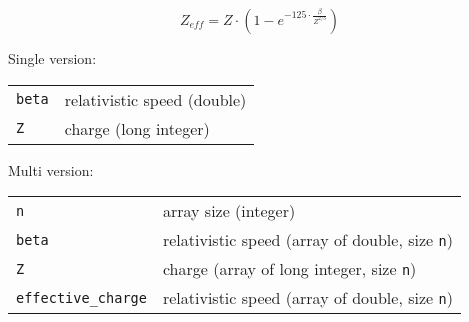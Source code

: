 \begin{equation}
Z_{eff}=Z\cdot(1-e^{-125\cdot\frac{\beta}{Z^{2/3}}})
\end{equation}

Single version:\\

\begin{tabular}{l l}
\texttt{beta} & relativistic speed (double) \\
\texttt{Z} & charge (long integer) \\
\end{tabular}

Multi version:\\

\begin{tabular}{l l}
\texttt{n} & array size (integer) \\
\texttt{beta} & relativistic speed (array of double, size \texttt{n}) \\
\texttt{Z} & charge (array of long integer, size \texttt{n}) \\
\texttt{effective\_charge} & relativistic speed (array of double, size \texttt{n}) \\
\end{tabular}